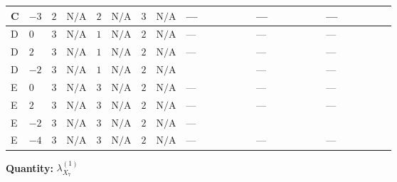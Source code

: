\documentclass[8pt]{article}
\begin{document}
\begin{landscape}
\begin{longtable}{@{}llcccccc >{\raggedright\arraybackslash}p{0.21\linewidth} >{\raggedright\arraybackslash}p{0.21\linewidth} >{\raggedright\arraybackslash}p{0.21\linewidth}@{}}
\midrule
C & $-3$ & $2$ & $\text{N/A}$ & $2$ & $\text{N/A}$ & $3$ & $\text{N/A}$ & --- & --- & --- \\
\midrule
D & $0$ & $3$ & $\text{N/A}$ & $1$ & $\text{N/A}$ & $2$ & $\text{N/A}$ & --- & --- & --- \\
\midrule
D & $2$ & $3$ & $\text{N/A}$ & $1$ & $\text{N/A}$ & $2$ & $\text{N/A}$ & --- & --- & --- \\
\midrule
D & $-2$ & $3$ & $\text{N/A}$ & $1$ & $\text{N/A}$ & $2$ & $\text{N/A}$ & \scriptsize\adjustbox{max width=\linewidth}{$\begin{gathered} +4 {\lambda_{S_1}^{(A)}} {\lambda_{X_{7}}^{(1)}}\end{gathered}$} & --- & --- \\
\midrule
E & $0$ & $3$ & $\text{N/A}$ & $3$ & $\text{N/A}$ & $2$ & $\text{N/A}$ & --- & --- & --- \\
\midrule
E & $2$ & $3$ & $\text{N/A}$ & $3$ & $\text{N/A}$ & $2$ & $\text{N/A}$ & --- & --- & --- \\
\midrule
E & $-2$ & $3$ & $\text{N/A}$ & $3$ & $\text{N/A}$ & $2$ & $\text{N/A}$ & --- & \scriptsize\adjustbox{max width=\linewidth}{$\begin{gathered} 8 {\lambda_{X_{1}}} (5 \left({\lambda_{X_{7}}^{(1)}}\right)^{*}+\left({\lambda_{X_{7}}^{(2)}}\right)^{*})\end{gathered}$} & \scriptsize\adjustbox{max width=\linewidth}{$\begin{gathered} +{\lambda_{12}^{(\times)}} (4 {\lambda_{X_{2}}}+4 {\lambda_{X_{7}}^{(2)}})\end{gathered}$} \\
\midrule
E & $-4$ & $3$ & $\text{N/A}$ & $3$ & $\text{N/A}$ & $2$ & $\text{N/A}$ & --- & --- & --- \\
\midrule
\bottomrule
\end{longtable}
\clearpage
\noindent\textbf{Quantity: }${\lambda_{X_{7}}^{(1)}}$\par\smallskip

\end{landscape}
\end{document}
